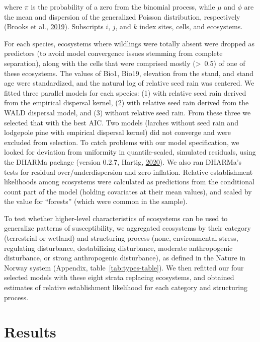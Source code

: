 \documentclass[
]{article}
\begin{document}
where \(\pi\) is the probability of a zero from the binomial process, while \(\mu\) and \(\phi\) are the mean and dispersion of the generalized Poisson distribution, respectively (Brooks et al., \protect\hyperlink{ref-brooksStatisticalModelingPatterns2019}{2019}).
Subscripts \(i\), \(j\), and \(k\) index sites, cells, and ecosystems.

For each species, ecosystems where wildlings were totally absent were dropped as predictors (to avoid model convergence issues stemming from complete separation), along with the cells that were comprised mostly (\textgreater~0.5) of one of these ecosystems.
The values of Bio1, Bio19, elevation from the stand, and stand age were standardized, and the natural log of relative seed rain was centered.
We fitted three parallel models for each species: (1) with relative seed rain derived from the empirical dispersal kernel, (2) with relative seed rain derived from the WALD dispersal model, and (3) without relative seed rain.
From these three we selected that with the best AIC.
Two models (larches without seed rain and lodgepole pine with empirical dispersal kernel) did not converge and were excluded from selection.
To catch problems with our model specification, we looked for deviation from uniformity in quantile-scaled, simulated residuals, using the DHARMa package (version 0.2.7, Hartig, \protect\hyperlink{ref-hartigDHARMaResidualDiagnostics2020}{2020}).
We also ran DHARMa's tests for residual over/underdispersion and zero-inflation.
Relative establishment likelihoods among ecosystems were calculated as predictions from the conditional count part of the model (holding covariates at their mean values), and scaled by the value for ``forests'' (which were common in the sample).

To test whether higher-level characteristics of ecosystems can be used to generalize patterns of susceptibility, we aggregated ecosystems by their category (terrestrial or wetland) and structuring process (none, environmental stress, regulating disturbance, destabilizing disturbance, moderate anthropogenic disturbance, or strong anthropogenic disturbance), as defined in the Nature in Norway system (Appendix, table~\ref{tab:types-table}).
We then refitted our four selected models with these eight strata replacing ecosystems, and obtained estimates of relative establishment likelihood for each category and structuring process.

\hypertarget{results}{%
\section{Results}\label{results}}
\end{document}
